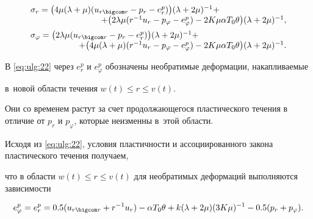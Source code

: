  \begin{equation} 

 \label{eq:ulg:22} 

\begin{array}{l} 

\sigma _{r} =\bigl(4\mu (\lambda +\mu ) (u_{r \bigcom r} -p_{r} -e_{r}^{p} )\bigr)

(\lambda +2\mu )^{-1} + 

\\ \hfill

\hspace{2cm}

+\bigl(2\lambda \mu (r^{-1} u_{r} -p_{\varphi } -e_{\varphi }^{p} )-

2K\mu \alpha T_{0} \theta \bigr) (\lambda +2\mu )^{-1} , 

\\[2mm] 

\sigma _{\varphi } =\bigl(2\lambda \mu (u_{r\bigcom r} -p_{r} -e_{r}^{p} )\bigr) 

(\lambda +2\mu )^{-1} + 

\\ 

\hspace{2cm}

+\bigl(4\mu (\lambda +\mu )(r^{-1} u_{r} -p_{\varphi } -e_{\varphi }^{p} )-2K\mu \alpha T_{0} \theta \bigr)(\lambda +2\mu )^{-1} . 

\end{array} 

\end{equation} 

В  \eqref{eq:ulg:22} через $e_{r}^{p} $ и $e_{\varphi }^{p} $ обозначены необратимые деформации, накапливаемые 

в~новой области течения $w(t)\le r\le v(t)$. 

Они со временем растут за счет продолжающегося пластического течения в отличие от $p_{r}$  и $p_{\varphi }$, которые неизменны в~этой области. 

Исходя из \eqref{eq:ulg:22}, условия пластичности и ассоциированного закона пластического течения получаем, 

что в области $w(t)\le r\le v(t)$ для необратимых деформаций выполняются зависимости

\begin{equation} 

\label{eq:ulg:23} 

e_{\varphi }^{p} =e_{r}^{p} =0.5(u_{r\bigcom r} +r^{-1} u_{r} )-

\alpha T_{0} \theta +k (\lambda +2\mu ) (3K\mu )^{-1} -0.5 (p_{r} +p_{\varphi } ). 

\end{equation} 



